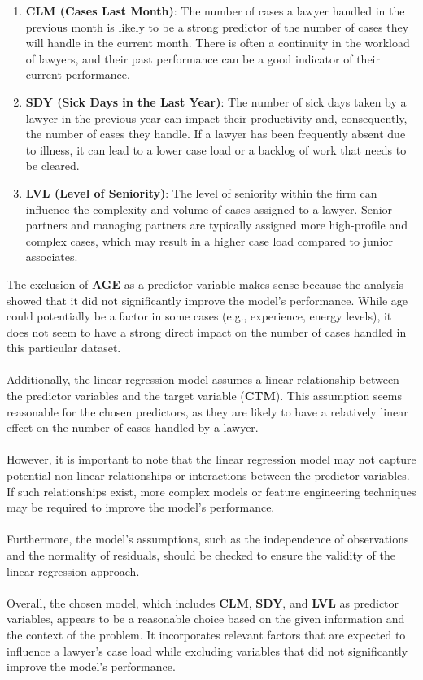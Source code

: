 \documentclass{article}
\begin{document}
\begin{enumerate}
    \item \textbf{CLM (Cases Last Month)}: The number of cases a lawyer handled in the previous month is likely to be a strong predictor of the number of cases they will handle in the current month. There is often a continuity in the workload of lawyers, and their past performance can be a good indicator of their current performance.
    
    \item \textbf{SDY (Sick Days in the Last Year)}: The number of sick days taken by a lawyer in the previous year can impact their productivity and, consequently, the number of cases they handle. If a lawyer has been frequently absent due to illness, it can lead to a lower case load or a backlog of work that needs to be cleared.
    
    \item \textbf{LVL (Level of Seniority)}: The level of seniority within the firm can influence the complexity and volume of cases assigned to a lawyer. Senior partners and managing partners are typically assigned more high-profile and complex cases, which may result in a higher case load compared to junior associates.
\end{enumerate}

\noindent The exclusion of \textbf{AGE} as a predictor variable makes sense because the analysis showed that it did not significantly improve the model's performance. While age could potentially be a factor in some cases (e.g., experience, energy levels), it does not seem to have a strong direct impact on the number of cases handled in this particular dataset.
\\\\
\noindent Additionally, the linear regression model assumes a linear relationship between the predictor variables and the target variable (\textbf{CTM}). This assumption seems reasonable for the chosen predictors, as they are likely to have a relatively linear effect on the number of cases handled by a lawyer.
\\\\
\noindent However, it is important to note that the linear regression model may not capture potential non-linear relationships or interactions between the predictor variables. If such relationships exist, more complex models or feature engineering techniques may be required to improve the model's performance.
\\\\
\noindent Furthermore, the model's assumptions, such as the independence of observations and the normality of residuals, should be checked to ensure the validity of the linear regression approach.
\\\\
\noindent Overall, the chosen model, which includes \textbf{CLM}, \textbf{SDY}, and \textbf{LVL} as predictor variables, appears to be a reasonable choice based on the given information and the context of the problem. It incorporates relevant factors that are expected to influence a lawyer's case load while excluding variables that did not significantly improve the model's performance.
\end{document}
